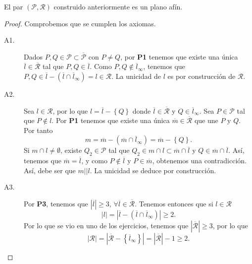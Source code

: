 \begin{theorem}
El par $\displaystyle \left(\mathcal{P}, \mathcal{R}\right) $ construido anteriormente es un plano afín. 
\end{theorem}
\begin{proof}
Comprobemos que se cumplen los axiomas.
\begin{description}
\item[A1.] Dados $\displaystyle P, Q \in \mathcal{P} \subset \overline{\mathcal{P}}$ con $\displaystyle P \neq Q $, por \textbf{P1} tenemos que existe una única $\displaystyle \overline{l} \in \overline{\mathcal{R}} $ tal que $\displaystyle P, Q \in \overline{l} $. Como $\displaystyle P,Q \not\in \overline{l}_{\infty} $, tenemos que $\displaystyle P,Q \in \overline{l}- \left(\overline{l} \cap \overline{l}_{\infty}\right) = l \in \mathcal{R}$. La unicidad de $\displaystyle l $ es por construcción de $\displaystyle \mathcal{R} $.
\item[A2.] Sea $\displaystyle l \in \mathcal{R} $, por lo que $\displaystyle l = \overline{l} - \left\{ Q\right\}  $ donde $\displaystyle \overline{l} \in \overline{\mathcal{R}} $ y $\displaystyle Q \in \overline{l}_{\infty} $. Sea $\displaystyle P \in \mathcal{P} $ tal que $\displaystyle P \not\in l $.
	Por \textbf{P1} tenemos que existe una única $\displaystyle \overline{m} \in \overline{\mathcal{R}} $ que une $\displaystyle P $ y $\displaystyle Q $. Por tanto
	\[ m = \overline{m} - \left(\overline{m} \cap \overline{l}_{\infty}\right) = \overline{m} - \left\{ Q\right\}  .\]
Si $\displaystyle m \cap l \neq \emptyset $, existe $\displaystyle Q_{2} \in \mathcal{P} $ tal que $\displaystyle Q_{2} \in m \cap l \subset \overline{m} \cap \overline{l} $ y $\displaystyle Q \in \overline{m} \cap \overline{l} $. Así, tenemos que $\displaystyle \overline{m} = \overline{l} $, y como $\displaystyle P \not\in \overline{l} $ y $\displaystyle P \in \overline{m} $, obtenemos una contradicción. Así, debe ser que $\displaystyle m | | l $. La unicidad se deduce por construcción.
\item[A3.] Por \textbf{P3}, tenemos que $\displaystyle \left|\overline{l}\right| \geq 3 $, $\displaystyle \forall \overline{l} \in \overline{\mathcal{R}} $. Tenemos entonces que si $\displaystyle l \in \mathcal{R} $ 
	\[ \left|l \right| = \left|\overline{l} - \left(\overline{l} \cap \overline{l}_{\infty}\right)\right| \geq 2  .\]
Por lo que se vio en uno de los ejercicios, tenemos que $\displaystyle \left|\overline{\mathcal{R}}\right| \geq 3 $, por lo que
\[ \left|\mathcal{R}\right| = \left|\overline{\mathcal{R}} - \left\{ \overline{l}_{\infty}\right\} \right| = \left|\overline{\mathcal{R}}\right| - 1 \geq 2 .\]
\end{description}
\end{proof}
